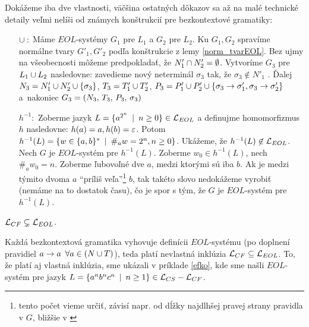 \begin{dokaz}
  Dokážeme iba dve vlastnosti, väčšina ostatných dôkazov sa až na
  malé technické detaily veľmi nelíši od známych konštrukcií pre
  bezkontextové gramatiky:
  \begin{itemize}
    \item[$\cup :$] Máme $EOL$-systémy $G_1$ pre $L_1$ a $G_2$
      pre $L_2$. Ku $G_1, G_2$ spravíme normálne tvary
      $G'_1,G'_2$ podľa konštrukcie z lemy \ref{norm_tvarEOL}.
      Bez ujmy na všeobecnosti môžeme predpokladať,
      že $N'_1 \cap N'_2 = \emptyset$.
      Vytvoríme $G_3$ pre $L_1 \cup L_2$ nasledovne:
      zavedieme nový neterminál $\sigma_3$ tak, že
      $\sigma_3 \not \in N'_1$ .
      Ďalej $N_3 = N'_1 \cup N'_2 \cup \{\sigma_3\}$,
      $T_3 = T'_1 \cup T'_2$,
      $P_3 = P'_1 \cup P'_2 \cup 
        \{\sigma_3 \rightarrow \sigma'_1, \sigma_3 \rightarrow \sigma'_2\}$
      a~nakoniec $G_3 = (N_3,\,T_3,\,P_3,\,\sigma_3)$

    \item[$h^{-1} :$] Zoberme jazyk
      $L = \{a^{2^n} \enspace |\enspace n \ge 0\} \in \mathcal{L}_{EOL}$
      a definujme homomorfizmus $h$ nasledovne:
      $h(a) = a, h(b) = \varepsilon$.
      Potom $h^{-1}(L) = \{w \in \{a,b\}^* \enspace |\enspace \#_a w = 2^n, n \ge 0\}$.
      Ukážeme, že $h^{-1}(L) \not \in \mathcal{L}_{EOL}$.
      Nech $G$ je $EOL$-systém pre $h^{-1}(L)$.
      Zoberme $w_0 \in h^{-1}(L)$, nech $\#_a w_0 = n$.
      Zoberme ľubovoľné dve $a$, medzi ktorými sú iba $b$. Ak je medzi
      týmito dvoma $a$ ``príliš veľa''\footnote{
        tento počet vieme určiť,
        závisí napr. od dĺžky najdlhšej pravej strany pravidla v $G$,
        bližšie v \cite{clos}
      } $b$, tak takéto slovo nedokážeme vyrobiť
      (nemáme na to dostatok času), čo je spor s tým, že $G$ je
      $EOL$-systém pre $h^{-1}(L)$.
  \end{itemize}
\end{dokaz}

\begin{veta}
  $\mathcal{L}_{CF} \subsetneq \mathcal{L}_{EOL}$.
\end{veta}

\begin{dokaz}
  Každá bezkontextová gramatika vyhovuje definícii $EOL$-systému
  (po doplnení pravidiel
  $a\rightarrow a \enspace \forall a \in(N \cup T)$),
  teda platí nevlastná inklúzia $\mathcal{L}_{CF} \subseteq \mathcal{L}_{EOL}$.
  To, že platí aj vlastná inklúzia, sme ukázali v príklade \ref{efko},
  kde sme našli $EOL$-systém pre jazyk
  $L = \{a^n b^n c^n \enspace |\enspace n\ge1\} \in \mathcal{L}_{CS} - \mathcal{L}_{CF}$.
\end{dokaz}

